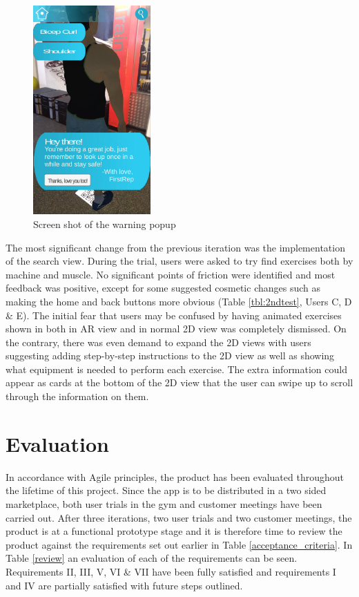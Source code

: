 \documentclass{l4proj}
\begin{document}
\begin{figure}
\centering
\includegraphics[height=8cm]{images/popup.png}
\caption{Screen shot of the warning popup} 
\label{fig:popup}
\end{figure}



The most significant change from the previous iteration was the implementation of the search view. During the trial, users were asked to try find exercises both by machine and muscle. No significant points of friction were identified and most feedback was positive, except for some suggested cosmetic changes such as making the home and back buttons more obvious (Table \ref{tbl:2ndtest}, Users C, D \& E). The initial fear that users may be confused by having animated exercises shown in both in AR view and in normal 2D view was completely dismissed. On the contrary, there was even demand to expand the 2D views with users suggesting adding step-by-step instructions to the 2D view as well as showing what equipment is needed to perform each exercise. The extra information could appear as cards at the bottom of the 2D view that the user can swipe up to scroll through the information on them.


\chapter{Evaluation}

In accordance with Agile principles, the product has been evaluated throughout the lifetime of this project. Since the app is to be distributed in a two sided marketplace, both user trials in the gym and customer meetings have been carried out. After three iterations, two user trials and two customer meetings, the product is at a functional prototype stage and it is therefore time to review the product against the requirements set out earlier in Table \ref{acceptance_criteria}. In Table \ref{review} an evaluation of each of the requirements can be seen. Requirements II, III, V, VI \& VII have been fully satisfied and requirements I and IV are partially satisfied with future steps outlined. 
\end{document}
